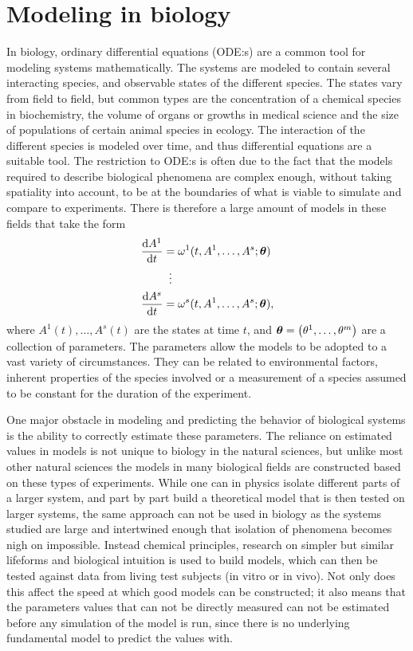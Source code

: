 \chapter{Modeling in biology}\label{ch:models}

In biology, ordinary differential equations (ODE:s) are a common tool for modeling systems mathematically.
The systems are modeled to contain several interacting species, and observable states of the different species.
The states vary from field to field, but common types are the concentration of a chemical species in biochemistry, the volume of organs or growths in medical science and the size of populations of certain animal species in ecology.
The interaction of the different species is modeled over time, and thus differential equations are a suitable tool.
The restriction to ODE:s is often due to the fact that the models required to describe biological phenomena are complex enough, without taking spatiality into account, to be at the boundaries of what is viable to simulate and compare to experiments.
There is therefore a large amount of models in these fields that take the form
\begin{align*}
  \begin{split} %
    \diff{A^1}{t} &= \omega^1(t, A^1, \dots, A^s; \vect{\theta}) \\
    &\equalsvdots \\
    \diff{A^s}{t} &= \omega^s(t, A^1, \dots, A^s; \vect{\theta}),
  \end{split}
\end{align*}
where \(A^1(t), \dots, A^s(t)\) are the states at time \(t\), and \(\vect{\theta} = \left(\theta^1, \dots, \theta^m\right)\) are a collection of parameters.
The parameters allow the models to be adopted to a vast variety of circumstances.
They can be related to environmental factors, inherent properties of the species involved or a measurement of a species assumed to be constant for the duration of the experiment.

One major obstacle in modeling and predicting the behavior of biological systems is the ability to correctly estimate these parameters.
The reliance on estimated values in models is not unique to biology in the natural sciences, but unlike most other natural sciences the models in many biological fields are constructed based on these types of experiments.
While one can in physics isolate different parts of a larger system, and part by part build a theoretical model that is then tested on larger systems, the same approach can not be used in biology as the systems studied are large and intertwined enough that isolation of phenomena becomes nigh on impossible.
Instead chemical principles, research on simpler but similar lifeforms and biological intuition is used to build models, which can then be tested against data from living test subjects (in vitro or in vivo).
Not only does this affect the speed at which good models can be constructed; it also means that the parameters values that can not be directly measured can not be estimated before any simulation of the model is run, since there is no underlying fundamental model to predict the values with.

